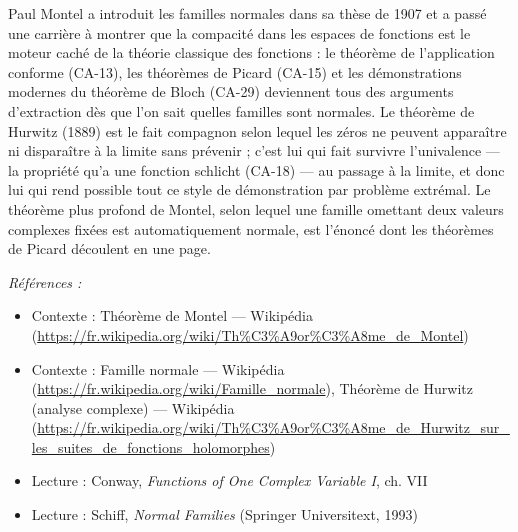 \documentclass[11pt]{article}
\newenvironment{refs}{\par\small\noindent\emph{Références :}\begin{itemize}\setlength\itemsep{0pt}}{\end{itemize}\normalsize}
\begin{document}
\noindent Paul Montel a introduit les familles normales dans sa thèse de 1907 et a passé
une carrière à montrer que la compacité dans les espaces de fonctions est le moteur caché de la
théorie classique des fonctions : le théorème de l'application conforme (CA-13), les théorèmes de
Picard (CA-15) et les démonstrations modernes du théorème de Bloch (CA-29) deviennent tous des
arguments d'extraction dès que l'on sait quelles familles sont normales. Le théorème de Hurwitz
(1889) est le fait compagnon selon lequel les zéros ne peuvent apparaître ni disparaître à la limite
sans prévenir ; c'est lui qui fait survivre l'univalence --- la propriété qu'a une fonction schlicht
(CA-18) --- au passage à la limite, et donc lui qui rend possible tout ce style de démonstration par
problème extrémal. Le théorème plus profond de Montel, selon lequel une famille omettant deux
valeurs complexes fixées est automatiquement normale, est l'énoncé dont les théorèmes de Picard
découlent en une page.

\begin{refs}
\item Contexte : Théorème de Montel --- Wikipédia (\url{https://fr.wikipedia.org/wiki/Th%C3%A9or%C3%A8me_de_Montel})
\item Contexte : Famille normale --- Wikipédia (\url{https://fr.wikipedia.org/wiki/Famille_normale}), Théorème de Hurwitz (analyse complexe) --- Wikipédia (\url{https://fr.wikipedia.org/wiki/Th%C3%A9or%C3%A8me_de_Hurwitz_sur_les_suites_de_fonctions_holomorphes})
\item Lecture : Conway, \textit{Functions of One Complex Variable I}, ch. VII
\item Lecture : Schiff, \textit{Normal Families} (Springer Universitext, 1993)
\end{refs}

\bigskip
\end{document}
